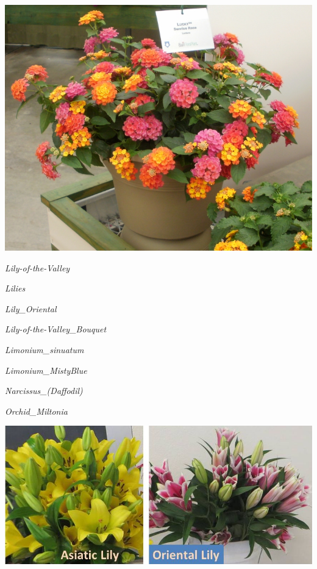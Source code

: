 \documentclass{article}
\begin{document}
\begin{center}
\includegraphics[width=0.9\textheight, angle=90]{../Lantana2.jpg}
\end{center}
\newpage

\noindent   
\vfill
\centerline{{\Large\emph{Lily-of-the-Valley}}}
\vfill
\newpage

\noindent   
\vfill
\centerline{{\Large\emph{Lilies}}}
\vfill
\newpage

\noindent   
\vfill
\centerline{{\Large\emph{Lily_Oriental}}}
\vfill
\newpage

\noindent   
\vfill
\centerline{{\Large\emph{Lily-of-the-Valley_Bouquet}}}
\vfill
\newpage

\noindent   
\vfill
\centerline{{\Large\emph{Limonium_sinuatum}}}
\vfill
\newpage

\noindent   
\vfill
\centerline{{\Large\emph{Limonium_MistyBlue}}}
\vfill
\newpage

\noindent   
\vfill
\centerline{{\Large\emph{Narcissus_(Daffodil)}}}
\vfill
\newpage

\noindent   
\vfill
\centerline{{\Large\emph{Orchid_Miltonia}}}
\vfill
\newpage

\begin{center}
\includegraphics[width=0.9\textheight, angle=90]{../Lilies.jpg}
\end{center}
\newpage
\end{document}
